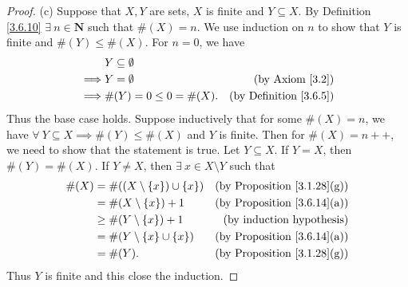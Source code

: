 \begin{proof}{(c)}
Suppose that \(X, Y\) are sets, \(X\) is finite and \(Y \subseteq X\).
By Definition \ref{3.6.10} \(\exists\ n \in \mathbf{N}\) such that \(\#(X) = n\).
We use induction on \(n\) to show that \(Y\) is finite and \(\#(Y) \leq \#(X)\).
For \(n = 0\), we have
\begin{align*}
& Y \subseteq \emptyset \\
\implies & Y = \emptyset & \text{(by Axiom \ref{3.2})} \\
\implies & \#(Y) = 0 \leq 0 = \#(X). & \text{(by Definition \ref{3.6.5})}
\end{align*}
Thus the base case holds.
Suppose inductively that for some \(\#(X) = n\), we have \(\forall\ Y \subseteq X \implies \#(Y) \leq \#(X)\) and \(Y\) is finite.
Then for \(\#(X) = n++\), we need to show that the statement is true.
Let \(Y \subseteq X\).
If \(Y = X\), then \(\#(Y) = \#(X)\).
If \(Y \neq X\), then \(\exists\ x \in X \setminus Y\) such that
\begin{align*}
\#(X) &= \#((X \setminus \{x\}) \cup \{x\}) & \text{(by Proposition \ref{3.1.28}(g))} \\
&= \#(X \setminus \{x\}) + 1 & \text{(by Proposition \ref{3.6.14}(a))} \\
&\geq \#(Y \setminus \{x\}) + 1 & \text{(by induction hypothesis)} \\
&= \#(Y \setminus \{x\} \cup \{x\}) & \text{(by Proposition \ref{3.6.14}(a))} \\
&= \#(Y). & \text{(by Proposition \ref{3.1.28}(g))}
\end{align*}
Thus \(Y\) is finite and this close the induction.


\end{proof}
